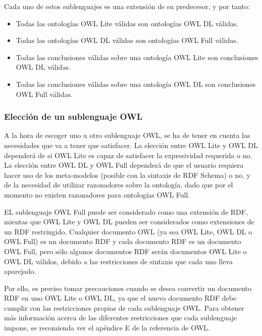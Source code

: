 		Cada uno de estos sublenguajes es una extensión de su predecesor, y por tanto:

		\begin{itemize}

			\item Todas las ontologías OWL Lite válidas son ontologías OWL DL válidas.

			\item Todas las ontologías OWL DL válidas son ontologías OWL Full válidas.

			\item Todas las conclusiones válidas sobre una ontología OWL Lite son conclusiones OWL DL válidas.

			\item Todas las conclusiones válidas sobre una ontología OWL DL son conclusiones OWL Full válidas.

		\end{itemize}
		
		\subsubsection{Elección de un sublenguaje OWL}

		A la hora de escoger uno u otro sublenguaje OWL, se ha de tener en cuenta las necesidades que va a tener que satisfacer. La elección entre OWL Lite y OWL DL dependerá de si OWL Lite es capaz de satisfacer la expresividad requerida o no. La elección entre OWL DL y OWL Full dependerá de que el usuario requiera hacer uso de los meta-modelos (posible con la sintaxis de RDF Schema) o no, y de la necesidad de utilizar razonadores sobre la ontología, dado que por el momento no existen razonadores para ontologías OWL Full. 
		
		EL sublenguaje OWL Full puede ser considerado como una extensión de RDF, mientas que OWL Lite y OWL DL pueden ser considerados como extensiones de un RDF restringido. Cualquier documento OWL (ya sea OWL Lite, OWL DL o OWL Full) es un documento RDF y cada documento RDF es un documento OWL Full, pero sólo algunos documentos RDF serán documentos OWL Lite o OWL DL válidos, debido a las restricciones de sintaxis que cada uno lleva aparejado. 
		
		Por ello, es preciso tomar precauciones cuando se desea convertir un documento RDF en uno OWL Lite o OWL DL, ya que el nuevo documento RDF debe cumplir con las restricciones propias de cada sublenguaje OWL. Para obtener más información acerca de las diferentes restricciones que cada sublenguaje impone, se recomienda ver el apéndice E de la referencia de OWL.
		
